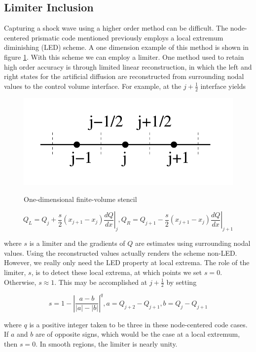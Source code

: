 \documentclass[final]{aiaa-pretty}
\begin{document}
\subsection{Limiter Inclusion}
Capturing a shock wave using a higher order method can be difficult.  The node-centered prismatic code mentioned previously \cite{Katz2015} employs a local extremum diminishing (LED) scheme.  A one dimension example of this method is shown in figure \ref{LEDstencil}.  With this scheme we can employ a limiter.  One method used to retain high order accuracy is through limited linear reconstruction, in which the left and right states for the artificial diffusion are reconstructed from surrounding nodal values to the control volume interface.  For example, at the $j + \frac{1}{2}$ interface yields  

\begin{figure}[h!]
\centering
\includegraphics[width=.5\textwidth]{LED2dStencil.png}
\label{LEDstencil}
\caption{One-dimensional finite-volume stencil}
\end{figure}


\begin{equation}
Q_L = Q_j + \frac{s}{2} (x_{j+1} - x_j) \left.\frac{dQ}{dx}\right|_{j} , 
Q_R = Q_{j+1} - \frac{s}{2} (x_{j+1} - x_j)\left.\frac{dQ}{dx}\right|_{j+1}
\end{equation}

where $s$ is a limiter and the gradients of $Q$ are estimates using surrounding nodal values.
Using the reconstructed values actually renders the scheme non-LED. However, we really
only need the LED property at local extrema. The role of the limiter, $s$, is to detect these
local extrema, at which points we set $s = 0$. Otherwise, $s \approx  1$. This may be accomplished
at $j + \frac{1}{2}$ by setting

\begin{equation}
s=1 - \left| \frac{a - b}{\left|a\right| - \left|b\right|}\right|^q, 
a=Q_{j+2} - Q_{j+1},
b=Q_j - Q_{j+1}
\end{equation}

where $q$ is a positive integer taken to be three in these node-centered code cases.
If $a$ and $b$ are of opposite signs,
which would be the case at a local extremum, then $s = 0$. In smooth regions, the limiter is
nearly unity.  
\end{document}

